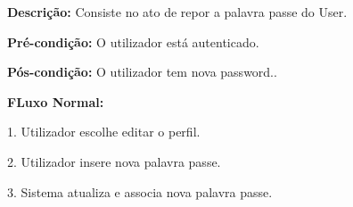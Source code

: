 \textbf{Descrição:}  Consiste no ato de repor a palavra passe do User.

\textbf{Pré-condição:} O utilizador está autenticado.

\textbf{Pós-condição:} O utilizador tem nova password..

\textbf{FLuxo Normal:}

1. Utilizador escolhe editar o perfil.

2. Utilizador insere nova palavra passe.

3. Sistema atualiza e associa nova palavra passe.